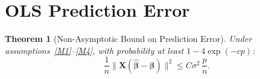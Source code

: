 \documentclass[14pt]{extarticle}
\theoremstyle{plain}
\newtheorem{theorem}{Theorem}[section]
\theoremstyle{definition}
\theoremstyle{remark}
\newcommand{\bX}{\mathbf{X}}
\def\bb{\boldsymbol{\beta}}
\newcommand{\hbb}{\hat{\boldsymbol{\beta}}}
\begin{document}
\section{OLS Prediction Error}\label{sec:prediction-error}

\begin{theorem}[Non-Asymptotic Bound on Prediction Error]\label{thm:prediction-error}
Under assumptions~\ref{M1}--\ref{M4}, with probability at least $1 - 4\exp(-cp)$:
\begin{equation}\label{eq:prediction-error}
\boxed{\frac{1}{n}\|\bX(\hbb - \bb)\|^2 \leqslant C\sigma^2\,\frac{p}{n}.}
\end{equation}
\end{theorem}
\end{document}

